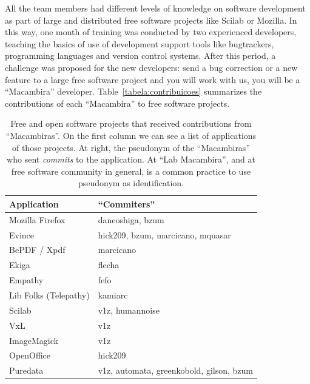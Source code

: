 \documentclass[letterpaper]{article}
\begin{document}
All the team members had different levels of knowledge on software
development as part of large and distributed free software projects
like Scilab or Mozilla. In this way, one month of training was
conducted by two experienced developers, teaching the basics of use of
development support tools like bugtrackers, programming languages and
version control systems. After this period, a challenge was proposed
for the new developers: send a bug correction or a new feature to a
large free software project and you will work with us, you will be a
``Macambira'' developer. Table~\ref{tabela:contribuicoes} summarizes
the contributions of each ``Macambira'' to free software projects.


\begin{table}
  \caption{Free and open software projects that received contributions
    from ``Macambiras''. On the first column we can see a list of
    applications of those projects. At right, the pseudonym of the
    ``Macambiras'' who sent \textit{commits} to the application. At
    ``Lab Macambira'', and at free software community in general, is a
    common practice to use pseudonym as identification.}
    \begin{tabular}{|l|l|}
        \hline
        Application           & ``Commiters''                       \\
        \hline \hline
        Mozilla Firefox       & daneoshiga, bzum                    \\
        Evince                & hick209, bzum, marcicano, mquasar   \\
        BePDF / Xpdf          & marcicano                           \\
        Ekiga                 & flecha                              \\
        Empathy               & fefo                                \\
        Lib Folks (Telepathy) & kamiarc                             \\
        Scilab                & v1z, humannoise                     \\
        VxL                   & v1z                                 \\
        ImageMagick           & v1z                                 \\
        OpenOffice            & hick209                             \\
        Puredata              & v1z, automata, greenkobold, gilson, bzum \\

\end{tabular}
\end{table}
\end{document}
